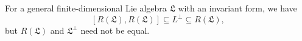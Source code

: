 For a general finite-dimensional Lie algebra $\mathfrak{L}$ with an invariant
form, we have
\[ [R(\mathfrak{L}), R(\mathfrak{L})] \subseteq L^{\perp} \subseteq R(\mathfrak{L}), \]
but $R(\mathfrak{L})$ and $\mathfrak{L}^\perp$ need not be equal.
